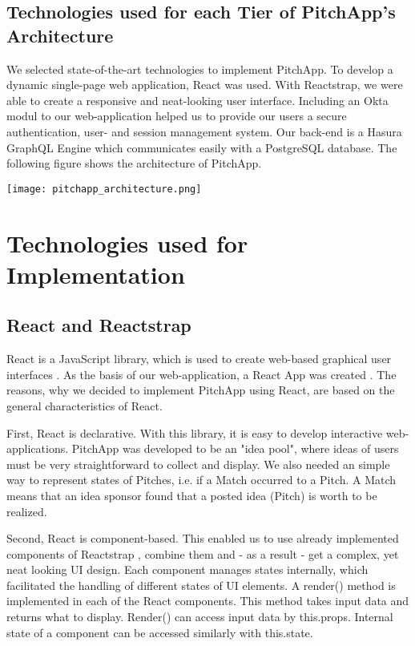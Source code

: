 \break

\section{Technologies used for each Tier of PitchApp's Architecture}

We selected state-of-the-art technologies to implement PitchApp. To develop a dynamic single-page web application, React was used. With Reactstrap, we were able to create a responsive and neat-looking user interface. Including an Okta modul to our web-application helped us to provide our users a secure authentication, user- and session management system. Our back-end is a Hasura GraphQL Engine which communicates easily with a PostgreSQL database. The following figure shows the architecture of PitchApp.

\begin{center}
	\texttt{[image: pitchapp\_architecture.png]}
\end{center}


\chapter{Technologies used for Implementation}
\section{React and Reactstrap}

React is a JavaScript library, which is used to create web-based graphical user interfaces \parencite{React}. As the basis of our web-application, a React App was created \parencite{Reactstrap}. The reasons, why we decided to implement PitchApp using React, are based on the general characteristics of React.

First, React is declarative. With this library, it is easy to develop interactive web-applications. PitchApp was developed to be an "idea pool", where ideas of users must be very straightforward to collect and display. We also needed an simple way to represent states of Pitches, i.e. if a Match occurred to a Pitch. A Match means that an idea sponsor found that a posted idea (Pitch) is worth to be realized.

Second, React is component-based. This enabled us to use already implemented components of Reactstrap \parencite{Reactstrap_comp}, combine them and - as a result - get a complex, yet neat looking UI design. Each component manages states internally, which facilitated the handling of different states of UI elements. A render() method is implemented in each of the React components. This method takes input data and returns what to display. Render() can access input data by this.props. Internal state of a component can be accessed similarly with this.state.

